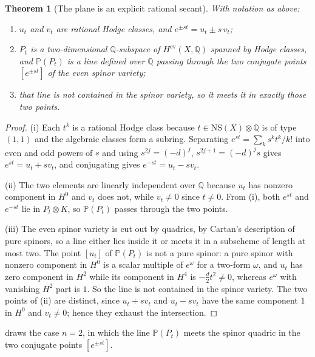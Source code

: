 \documentclass[11pt,reqno]{amsart}
\theoremstyle{plain}
\newtheorem{theorem}{Theorem}[section]
\theoremstyle{definition}
\theoremstyle{remark}
\newcommand{\QQ}{\mathbb{Q}}
\newcommand{\PP}{\mathbb{P}}
\newcommand{\NS}{\mathrm{NS}}
\begin{document}
\begin{theorem}[The plane is an explicit rational secant]\label{thm:plane}
With notation as above:
\begin{enumerate}[label=\textup{(\roman*)}]
\item $u_{t}$ and $v_{t}$ are rational Hodge classes, and
  $e^{\pm st}=u_{t}\pm s\,v_{t}$;
\item $P_{t}$ is a two-dimensional $\QQ$-subspace of $H^{\mathrm{ev}}(X,\QQ)$
  spanned by Hodge classes, and $\PP(P_{t})$ is a line defined over $\QQ$
  passing through the two conjugate points $[e^{\pm st}]$ of the even spinor
  variety;
\item that line is not contained in the spinor variety, so it meets it in
  exactly those two points.
\end{enumerate}
\end{theorem}

\begin{proof}
(i) Each $t^{k}$ is a rational Hodge class because $t\in\NS(X)\otimes\QQ$ is
of type $(1,1)$ and the algebraic classes form a subring. Separating
$e^{st}=\sum_{k}s^{k}t^{k}/k!$ into even and odd powers of $s$ and using
$s^{2j}=(-d)^{j}$, $s^{2j+1}=(-d)^{j}s$ gives $e^{st}=u_{t}+sv_{t}$, and
conjugating gives $e^{-st}=u_{t}-sv_{t}$.

(ii) The two elements are linearly independent over $\QQ$ because $u_{t}$ has
nonzero component in $H^{0}$ and $v_{t}$ does not, while $v_{t}\ne0$ since
$t\ne0$. From (i), both $e^{st}$ and $e^{-st}$ lie in $P_{t}\otimes K$, so
$\PP(P_{t})$ passes through the two points.

(iii) The even spinor variety is cut out by quadrics, by Cartan's description
of pure spinors, so a line either lies inside it or meets it in a subscheme of
length at most two. The point $[u_{t}]$ of $\PP(P_{t})$ is not a pure spinor:
a pure spinor with nonzero component in $H^{0}$ is a scalar multiple of
$e^{\omega}$ for a two-form $\omega$, and $u_{t}$ has zero component in
$H^{2}$ while its component in $H^{4}$ is $-\tfrac{d}{2}t^{2}\ne0$, whereas
$e^{\omega}$ with vanishing $H^{2}$ part is $1$. So the line is not contained
in the spinor variety. The two points of (ii) are distinct, since
$u_{t}+sv_{t}$ and $u_{t}-sv_{t}$ have the same component $1$ in $H^{0}$ and
$v_{t}\ne0$; hence they exhaust the intersection.
\end{proof}

 draws the case $n=2$, in which the line $\PP(P_{t})$
meets the spinor quadric in the two conjugate points $[e^{\pm st}]$.
\end{document}
